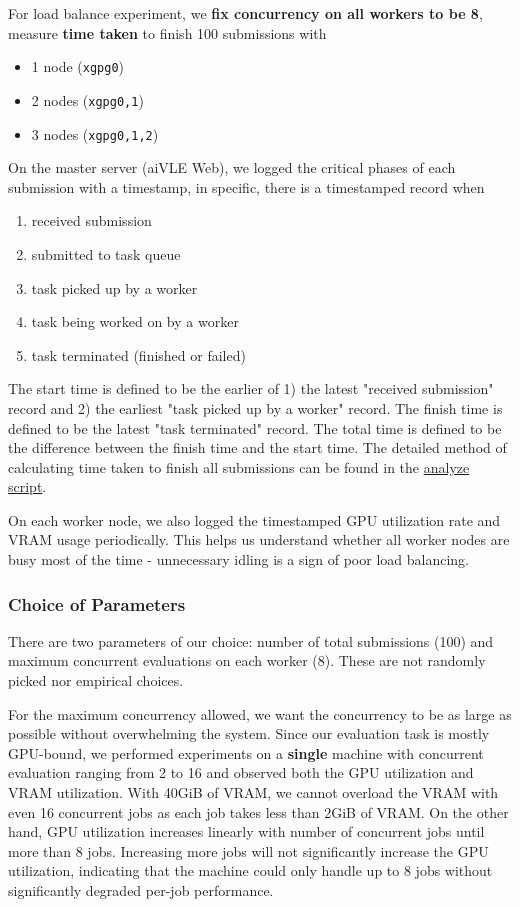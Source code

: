 For load balance experiment, we \textbf{fix concurrency on all workers to be 8}, measure \textbf{time taken} to finish 100 submissions with
\begin{itemize}
    \item 1 node (\texttt{xgpg0})
    \item 2 nodes (\texttt{xgpg0,1})
    \item 3 nodes (\texttt{xgpg0,1,2})
\end{itemize}

On the master server (aiVLE Web), we logged the critical phases of each submission with a timestamp, in specific, there is a timestamped record when
\begin{enumerate}
    \item received submission
    \item submitted to task queue
    \item task picked up by a worker
    \item task being worked on by a worker
    \item task terminated (finished or failed)
\end{enumerate}

The start time is defined to be the earlier of 1) the latest "received submission" record and 2) the earliest "task picked up by a worker" record. The finish time is defined to be the latest "task terminated" record. The total time is defined to be the difference between the finish time and the start time. The detailed method of calculating time taken to finish all submissions can be found in the \href{https://github.com/edu-ai/aivle-experiment-logs/blob/main/web/analyze.ipynb}{analyze script}.

On each worker node, we also logged the timestamped GPU utilization rate and VRAM usage periodically. This helps us understand whether all worker nodes are busy most of the time - unnecessary idling is a sign of poor load balancing.

\subsubsection{Choice of Parameters}
\label{sss:choice-of-params}

There are two parameters of our choice: number of total submissions (100) and maximum concurrent evaluations on each worker (8). These are not randomly picked nor empirical choices.

For the maximum concurrency allowed, we want the concurrency to be as large as possible without overwhelming the system. Since our evaluation task is mostly GPU-bound, we performed experiments on a \textbf{single} machine with concurrent evaluation ranging from 2 to 16 and observed both the GPU utilization and VRAM utilization. With 40GiB of VRAM, we cannot overload the VRAM with even 16 concurrent jobs as each job takes less than 2GiB of VRAM. On the other hand, GPU utilization increases linearly with number of concurrent jobs until more than 8 jobs. Increasing more jobs will not significantly increase the GPU utilization, indicating that the machine could only handle up to 8 jobs without significantly degraded per-job performance.

